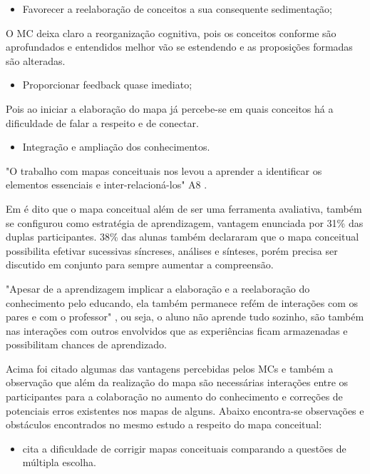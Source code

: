 \begin{itemize}
\item Favorecer a reelaboração de conceitos a sua consequente sedimentação;
\end{itemize}

O MC deixa claro a reorganização cognitiva, pois os conceitos conforme são aprofundados e entendidos melhor vão se estendendo e as proposições formadas são alteradas.\cite{vantagensDesvantagensMC}

\begin{itemize}
\item Proporcionar feedback quase imediato;
\end{itemize}

Pois ao iniciar a elaboração do mapa já percebe-se em quais conceitos há a dificuldade de falar a respeito e de conectar.


\begin{itemize}
\item Integração e ampliação dos conhecimentos.
\end{itemize}
"O trabalho com mapas conceituais nos levou a aprender a identificar os elementos essenciais e inter-relacioná-los" A8 \cite{vantagensDesvantagensMC}.

Em \cite{vantagensDesvantagensMC} é dito que o mapa conceitual além de ser uma ferramenta avaliativa, também se configurou como estratégia de aprendizagem, vantagem enunciada por 31\% das duplas participantes.
38\% das alunas também declararam que o mapa conceitual possibilita efetivar sucessivas síncreses, análises e sínteses, porém precisa ser discutido em conjunto para sempre aumentar a compreensão.

"Apesar de a aprendizagem implicar a elaboração e a reelaboração do conhecimento pelo educando, ela também permanece refém de interações com os pares e com o professor" \cite[p. 180]{vantagensDesvantagensMC}, ou seja, o aluno não aprende tudo sozinho, são também nas interações com outros envolvidos que as experiências ficam armazenadas e possibilitam chances de aprendizado.

Acima foi citado algumas das vantagens percebidas pelos MCs e também a observação que além da realização do mapa são necessárias interações entre os participantes para a colaboração no aumento do conhecimento e correções de potenciais erros existentes nos mapas de alguns. Abaixo encontra-se observações e obstáculos encontrados no mesmo estudo a respeito do mapa conceitual: 

\begin{itemize}
 \item  \cite{dificuldadesMapaConceitual} cita a dificuldade de corrigir mapas conceituais comparando a questões de múltipla escolha. 
\end{itemize}

